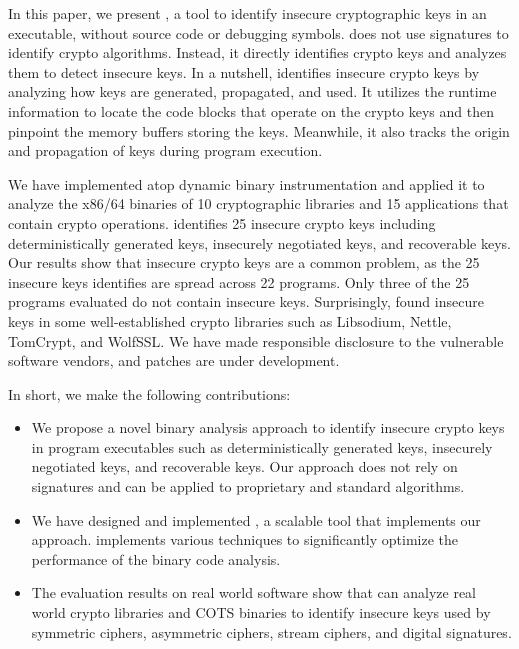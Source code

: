 In this paper, we present \sysname, a tool to identify insecure cryptographic keys in an executable, without source code or debugging symbols. 
\sysname does not use signatures to identify crypto algorithms. 
Instead,  it directly identifies crypto keys and analyzes them  to detect insecure keys. 
In a nutshell, \sysname  identifies insecure crypto keys by analyzing how keys are generated, propagated, and used.  
It utilizes the runtime information to locate the code blocks that operate on the crypto keys and then pinpoint the memory buffers storing the keys. 
Meanwhile, it also tracks the origin and propagation of keys during program execution. 

We have implemented \sysname atop dynamic binary instrumentation and applied it to analyze the x86/64 binaries of 
10 cryptographic libraries and 15 applications that contain crypto operations.
\sysname  identifies 25 insecure crypto keys including deterministically generated keys, insecurely negotiated keys, and recoverable keys. 
Our results show that insecure crypto keys are a common problem, as the 25 insecure keys  \sysname identifies are spread across 22 programs. 
Only three of the 25 programs evaluated do not contain insecure keys. 
Surprisingly, \sysname found insecure keys  in some well-established crypto libraries such as \textsf{\small Libsodium}, \textsf{\small Nettle}, \textsf{\small TomCrypt}, and \textsf{\small WolfSSL}. 
We have made responsible disclosure to the vulnerable software vendors, and patches are under development. 

In short, we make the following contributions:
\begin{itemize}
\item We propose a novel binary analysis approach to identify insecure crypto keys in program executables such as deterministically generated keys, insecurely negotiated keys, and recoverable keys. Our approach does not rely on signatures and can be applied to proprietary and standard algorithms. 

\item We have designed and implemented \sysname, a scalable tool that implements our approach. \sysname implements various techniques to significantly optimize the performance of the binary code analysis. 

\item The evaluation results on real world software show that \sysname can analyze real world crypto libraries and COTS binaries to  identify insecure keys used by symmetric ciphers, asymmetric ciphers, stream ciphers, and digital signatures.
\end{itemize}